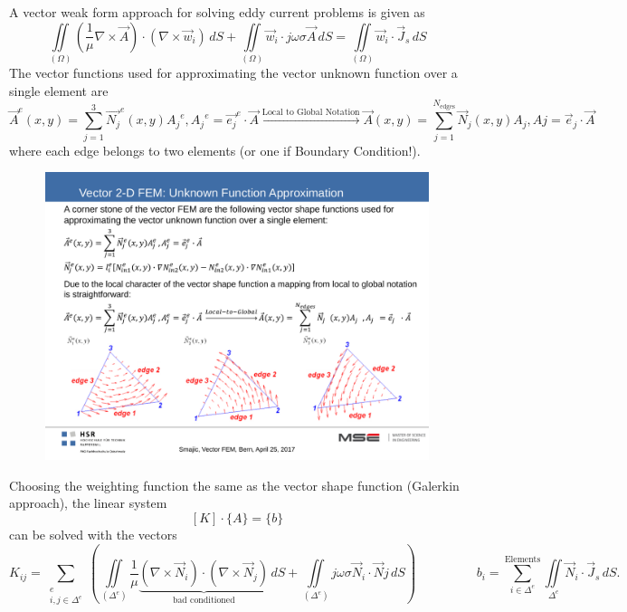 A vector weak form approach for solving eddy current problems is given as
\begin{equation*}
	\iint\limits_{\left(\Omega\right)} \left(\frac{1}{\mu}\nabla \times \vec{A}\right) \cdot \left(\nabla \times \vec{w}_i\right)\,dS + \iint\limits_{\left(\Omega\right)} \vec{w}_i \cdot j\omega\sigma\vec{A}\,dS = \iint\limits_{\left(\Omega\right)}\vec{w}_i \cdot \vec{J}_s\,dS
 \end{equation*}
 The vector functions used for approximating the vector unknown function over a single element are
 \begin{equation*}
 	\vec{A}^e\left(x,y\right) = \sum_{j=1}^{3}\vec{N_j}^e\left(x,y\right) {A_j}^e, {A_j}^e = \vec{e_j}^e \cdot \vec{A} \xrightarrow{\textrm{Local to Global Notation}} \vec{A}\left(x,y\right) = \sum_{j=1}^{N_{\textrm{edges}}} \vec{N}_j \left(x,y\right) A_j, Aj = \vec{e}_j \cdot \vec{A}
 \end{equation*}
 where each edge belongs to two elements (or one if Boundary Condition!).
 \begin{figure}[h!]
	 \centering
	 \includegraphics[width=.8\textwidth]{./images/vectorShape.pdf}
 \end{figure}
 
Choosing the weighting function the same as the vector shape function (Galerkin approach), the linear system
\begin{equation*}
	\left[K\right] \cdot \{A\} = \{b\}
\end{equation*}
can be solved with the vectors
\begin{equation*}
	K_{ij} = \sum_{\substack{e\\i,j\in\Delta^e}} \left(\iint\limits_{\left(\Delta^e\right)} \frac{1}{\mu} \underbrace{\left(\nabla \times \vec{N}_i\right)\cdot \left(\nabla \times \vec{N}_j\right)}_{\textrm{bad conditioned}}\,dS + \iint\limits_{\left(\Delta^e\right)} j\omega\sigma\vec{N}_i\cdot \vec{N}j\,dS\right)
	\hspace{2cm}
	b_i = \sum_{i\in\Delta^e}^{\textrm{Elements}} \iint\limits_{\Delta^e} \vec{N}_i \cdot \vec{J}_s\,dS.
\end{equation*}